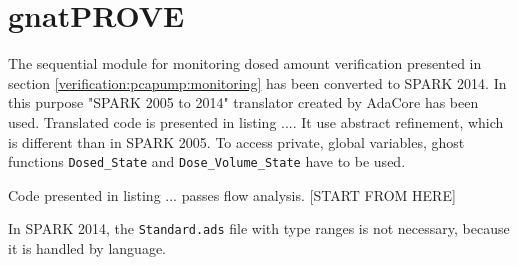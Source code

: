 \section{gnatPROVE}
\label{verification:gnatprove}

The sequential module for monitoring dosed amount verification presented in section \ref{verification:pcapump:monitoring} has been converted to SPARK 2014. In this purpose "SPARK 2005 to 2014" translator created by AdaCore has been used. Translated code is presented in listing .... It use abstract refinement, which is different than in SPARK 2005. To access private, global variables, ghost functions \lstinline{Dosed_State} and \lstinline{Dose_Volume_State} have to be used. 


Code presented in listing ... passes flow analysis. [START FROM HERE]

In SPARK 2014, the \lstinline{Standard.ads} file with type ranges is not necessary, because it is handled by language. 

